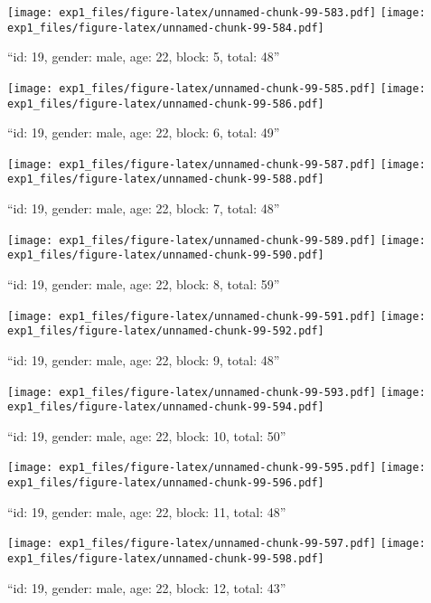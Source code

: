 \documentclass[,]{article}
\begin{document}
\texttt{[image: exp1\_files/figure-latex/unnamed-chunk-99-583.pdf]}
\texttt{[image: exp1\_files/figure-latex/unnamed-chunk-99-584.pdf]}

\newpage
[1] 

``id: 19, gender: male, age: 22, block: 5, total: 48''

\texttt{[image: exp1\_files/figure-latex/unnamed-chunk-99-585.pdf]}
\texttt{[image: exp1\_files/figure-latex/unnamed-chunk-99-586.pdf]}

\newpage
[1] 

``id: 19, gender: male, age: 22, block: 6, total: 49''

\texttt{[image: exp1\_files/figure-latex/unnamed-chunk-99-587.pdf]}
\texttt{[image: exp1\_files/figure-latex/unnamed-chunk-99-588.pdf]}

\newpage
[1] 

``id: 19, gender: male, age: 22, block: 7, total: 48''

\texttt{[image: exp1\_files/figure-latex/unnamed-chunk-99-589.pdf]}
\texttt{[image: exp1\_files/figure-latex/unnamed-chunk-99-590.pdf]}

\newpage
[1] 

``id: 19, gender: male, age: 22, block: 8, total: 59''

\texttt{[image: exp1\_files/figure-latex/unnamed-chunk-99-591.pdf]}
\texttt{[image: exp1\_files/figure-latex/unnamed-chunk-99-592.pdf]}

\newpage
[1] 

``id: 19, gender: male, age: 22, block: 9, total: 48''

\texttt{[image: exp1\_files/figure-latex/unnamed-chunk-99-593.pdf]}
\texttt{[image: exp1\_files/figure-latex/unnamed-chunk-99-594.pdf]}

\newpage
[1] 

``id: 19, gender: male, age: 22, block: 10, total: 50''

\texttt{[image: exp1\_files/figure-latex/unnamed-chunk-99-595.pdf]}
\texttt{[image: exp1\_files/figure-latex/unnamed-chunk-99-596.pdf]}

\newpage
[1] 

``id: 19, gender: male, age: 22, block: 11, total: 48''

\texttt{[image: exp1\_files/figure-latex/unnamed-chunk-99-597.pdf]}
\texttt{[image: exp1\_files/figure-latex/unnamed-chunk-99-598.pdf]}

\newpage
[1] 

``id: 19, gender: male, age: 22, block: 12, total: 43''
\end{document}
